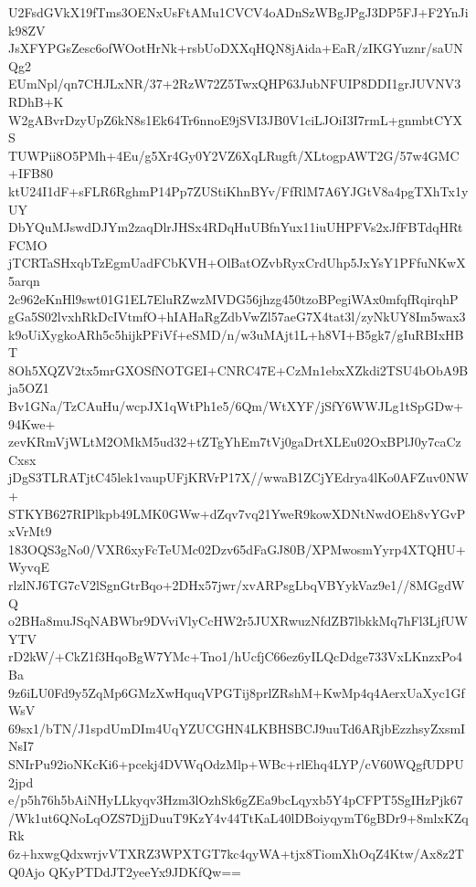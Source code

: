 U2FsdGVkX19fTms3OENxUsFtAMu1CVCV4oADnSzWBgJPgJ3DP5FJ+F2YnJik98ZV
JsXFYPGsZesc6ofWOotHrNk+rsbUoDXXqHQN8jAida+EaR/zIKGYuznr/saUNQg2
EUmNpl/qn7CHJLxNR/37+2RzW72Z5TwxQHP63JubNFUIP8DDI1grJUVNV3RDhB+K
W2gABvrDzyUpZ6kN8s1Ek64Tr6nnoE9jSVI3JB0V1ciLJOiI3I7rmL+gnmbtCYXS
TUWPii8O5PMh+4Eu/g5Xr4Gy0Y2VZ6XqLRugft/XLtogpAWT2G/57w4GMC+IFB80
ktU24I1dF+sFLR6RghmP14Pp7ZUStiKhnBYv/FfRlM7A6YJGtV8a4pgTXhTx1yUY
DbYQuMJswdDJYm2zaqDlrJHSx4RDqHuUBfnYux11iuUHPFVs2xJfFBTdqHRtFCMO
jTCRTaSHxqbTzEgmUadFCbKVH+OlBatOZvbRyxCrdUhp5JxYsY1PFfuNKwX5arqn
2c962eKnHl9swt01G1EL7EluRZwzMVDG56jhzg450tzoBPegiWAx0mfqfRqirqhP
gGa5S02lvxhRkDcIVtmfO+hIAHaRgZdbVwZl57aeG7X4tat3l/zyNkUY8Im5wax3
k9oUiXygkoARh5c5hijkPFiVf+eSMD/n/w3uMAjt1L+h8VI+B5gk7/gIuRBIxHBT
8Oh5XQZV2tx5mrGXOSfNOTGEI+CNRC47E+CzMn1ebxXZkdi2TSU4bObA9Bja5OZ1
Bv1GNa/TzCAuHu/wcpJX1qWtPh1e5/6Qm/WtXYF/jSfY6WWJLg1tSpGDw+94Kwe+
zevKRmVjWLtM2OMkM5ud32+tZTgYhEm7tVj0gaDrtXLEu02OxBPlJ0y7caCzCxsx
jDgS3TLRATjtC45lek1vaupUFjKRVrP17X//wwaB1ZCjYEdrya4lKo0AFZuv0NW+
STKYB627RIPlkpb49LMK0GWw+dZqv7vq21YweR9kowXDNtNwdOEh8vYGvPxVrMt9
183OQS3gNo0/VXR6xyFcTeUMc02Dzv65dFaGJ80B/XPMwosmYyrp4XTQHU+WyvqE
rlzlNJ6TG7cV2lSgnGtrBqo+2DHx57jwr/xvARPsgLbqVBYykVaz9e1//8MGgdWQ
o2BHa8muJSqNABWbr9DVviVlyCcHW2r5JUXRwuzNfdZB7lbkkMq7hFl3LjfUWYTV
rD2kW/+CkZ1f3HqoBgW7YMc+Tno1/hUcfjC66ez6yILQcDdge733VxLKnzxPo4Ba
9z6iLU0Fd9y5ZqMp6GMzXwHquqVPGTij8prlZRshM+KwMp4q4AerxUaXyc1GfWsV
69sx1/bTN/J1spdUmDIm4UqYZUCGHN4LKBHSBCJ9uuTd6ARjbEzzhsyZxsmINsI7
SNIrPu92ioNKcKi6+pcekj4DVWqOdzMlp+WBc+rlEhq4LYP/cV60WQgfUDPU2jpd
e/p5h76h5bAiNHyLLkyqv3Hzm3lOzhSk6gZEa9bcLqyxb5Y4pCFPT5SgIHzPjk67
/Wk1ut6QNoLqOZS7DjjDuuT9KzY4v44TtKaL40lDBoiyqymT6gBDr9+8mlxKZqRk
6z+hxwgQdxwrjvVTXRZ3WPXTGT7kc4qyWA+tjx8TiomXhOqZ4Ktw/Ax8z2TQ0Ajo
QKyPTDdJT2yeeYx9JDKfQw==
